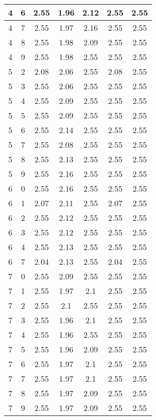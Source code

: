 \begin{longtable}{|c|c||c||c|c||c|c|}
	4 & 6 & 2.55 & 1.96 & 2.12 & 2.55 & 2.55 \\ \hline
	4 & 7 & 2.55 & 1.97 & 2.16 & 2.55 & 2.55 \\ \hline
	4 & 8 & 2.55 & 1.98 & 2.09 & 2.55 & 2.55 \\ \hline
	4 & 9 & 2.55 & 1.98 & 2.55 & 2.55 & 2.55 \\ \hline
	5 & 2 & 2.08 & 2.06 & 2.55 & 2.08 & 2.55 \\ \hline
	5 & 3 & 2.55 & 2.06 & 2.55 & 2.55 & 2.55 \\ \hline
	5 & 4 & 2.55 & 2.09 & 2.55 & 2.55 & 2.55 \\ \hline
	5 & 5 & 2.55 & 2.09 & 2.55 & 2.55 & 2.55 \\ \hline
	5 & 6 & 2.55 & 2.14 & 2.55 & 2.55 & 2.55 \\ \hline
	5 & 7 & 2.55 & 2.08 & 2.55 & 2.55 & 2.55 \\ \hline
	5 & 8 & 2.55 & 2.13 & 2.55 & 2.55 & 2.55 \\ \hline
	5 & 9 & 2.55 & 2.16 & 2.55 & 2.55 & 2.55 \\ \hline
	6 & 0 & 2.55 & 2.16 & 2.55 & 2.55 & 2.55 \\ \hline
	6 & 1 & 2.07 & 2.11 & 2.55 & 2.07 & 2.55 \\ \hline
	6 & 2 & 2.55 & 2.12 & 2.55 & 2.55 & 2.55 \\ \hline
	6 & 3 & 2.55 & 2.12 & 2.55 & 2.55 & 2.55 \\ \hline
	6 & 4 & 2.55 & 2.13 & 2.55 & 2.55 & 2.55 \\ \hline
	6 & 7 & 2.04 & 2.13 & 2.55 & 2.04 & 2.55 \\ \hline
	7 & 0 & 2.55 & 2.09 & 2.55 & 2.55 & 2.55 \\ \hline
	7 & 1 & 2.55 & 1.97 & 2.1 & 2.55 & 2.55 \\ \hline
	7 & 2 & 2.55 & 2.1 & 2.55 & 2.55 & 2.55 \\ \hline
	7 & 3 & 2.55 & 1.96 & 2.1 & 2.55 & 2.55 \\ \hline
	7 & 4 & 2.55 & 1.96 & 2.55 & 2.55 & 2.55 \\ \hline
	7 & 5 & 2.55 & 1.96 & 2.09 & 2.55 & 2.55 \\ \hline
	7 & 6 & 2.55 & 1.97 & 2.1 & 2.55 & 2.55 \\ \hline
	7 & 7 & 2.55 & 1.97 & 2.1 & 2.55 & 2.55 \\ \hline
	7 & 8 & 2.55 & 1.97 & 2.09 & 2.55 & 2.55 \\ \hline
	7 & 9 & 2.55 & 1.97 & 2.09 & 2.55 & 2.55 \\ \hline
\end{longtable}
